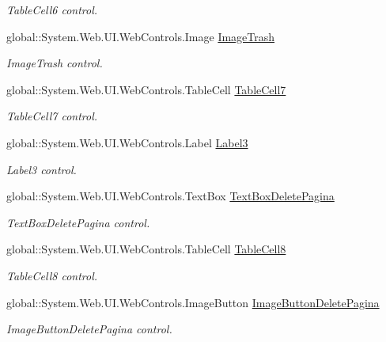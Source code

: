 \begin{DoxyCompactItemize}
\begin{DoxyCompactList}\small\item\em TableCell6 control. \item\end{DoxyCompactList}\item 
global::System.Web.UI.WebControls.Image \hyperlink{class_sistema_r_h_1_1tab__default_a9e9bfdd15165e2404eadd752129626b6}{ImageTrash}
\begin{DoxyCompactList}\small\item\em ImageTrash control. \item\end{DoxyCompactList}\item 
global::System.Web.UI.WebControls.TableCell \hyperlink{class_sistema_r_h_1_1tab__default_ac0d184d5ba7688ee9b13fd5baa0758a9}{TableCell7}
\begin{DoxyCompactList}\small\item\em TableCell7 control. \item\end{DoxyCompactList}\item 
global::System.Web.UI.WebControls.Label \hyperlink{class_sistema_r_h_1_1tab__default_a66450fda5aa860689df3339b3c39ca3f}{Label3}
\begin{DoxyCompactList}\small\item\em Label3 control. \item\end{DoxyCompactList}\item 
global::System.Web.UI.WebControls.TextBox \hyperlink{class_sistema_r_h_1_1tab__default_a538e763744e1d0202d6c5bfef2ff3b7f}{TextBoxDeletePagina}
\begin{DoxyCompactList}\small\item\em TextBoxDeletePagina control. \item\end{DoxyCompactList}\item 
global::System.Web.UI.WebControls.TableCell \hyperlink{class_sistema_r_h_1_1tab__default_a8bb9079f84e1f6527220772d29f5cca4}{TableCell8}
\begin{DoxyCompactList}\small\item\em TableCell8 control. \item\end{DoxyCompactList}\item 
global::System.Web.UI.WebControls.ImageButton \hyperlink{class_sistema_r_h_1_1tab__default_a71b7957bed07d2d8e9026175d3ecdaf0}{ImageButtonDeletePagina}
\begin{DoxyCompactList}\small\item\em ImageButtonDeletePagina control. \item\end{DoxyCompactList}\item 

\end{DoxyCompactItemize}
